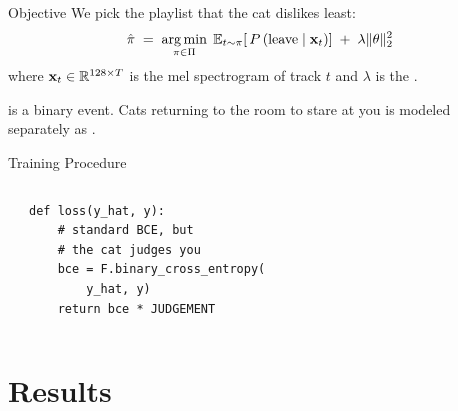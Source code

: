 \documentclass[10pt,aspectratio=169,xcolor=table]{beamer}
\begin{document}
\begin{frame}{Objective}
  We pick the playlist that the cat dislikes least:
  \[
    \hat{\pi} \;=\; \argmin_{\pi \in \Pi}\;
      \E_{t \sim \pi}\!\left[\, P\left(\text{leave} \given \mathbf{x}_t\right) \right]
      \;+\; \lambda \norm{\theta}_2^2
  \]
  where $\mathbf{x}_t \in \mathbb{R}^{128 \times T}$ is the mel spectrogram of track
  $t$ and $\lambda$ is the .
  \medskip

  \begin{aside}[Notation]
     is a binary event. Cats returning to the room to stare at
    you is modeled separately as .
  \end{aside}
\end{frame}

\begin{frame}[fragile]{Training Procedure}
  \begin{columns}[T]
    \begin{algorithm}[H]
      \caption{CatNet training}
      \BlankLine
    \end{algorithm}
      \begin{lstlisting}[style=numbered]
def loss(y_hat, y):
    # standard BCE, but
    # the cat judges you
    bce = F.binary_cross_entropy(
        y_hat, y)
    return bce * JUDGEMENT
\end{lstlisting}
  \end{columns}
\end{frame}

\section{Results}
\end{document}
